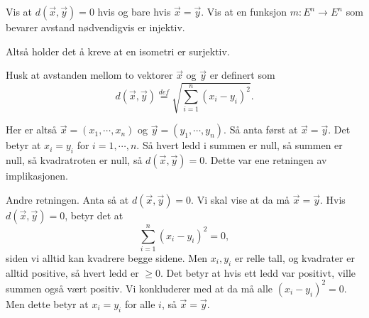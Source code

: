 \documentclass[11pt, norsk]{article}
\begin{document}
\begin{oppg}
Vis at $d(\vec x, \vec y) = 0$ hvis og bare hvis $\vec x = \vec y$. Vis at en funksjon $m:E^n \to E^n$ som bevarer avstand nødvendigvis er injektiv.

Altså holder det å kreve at en isometri er surjektiv.
\end{oppg}
\begin{losn}
Husk at avstanden mellom to vektorer $\vec x$ og $\vec y$ er definert som $$d(\vec x,\vec y) \stackrel{def}{=} \sqrt{ \sum_{i=1}^n (x_i-y_i)^2 }.$$

Her er altså $\vec x = (x_1,\cdots,x_n)$ og $\vec y = (y_1,\cdots,y_n)$. Så anta først at $\vec x = \vec y$. Det betyr at $x_i=y_i$ for $i=1,\cdots,n$. Så hvert ledd i summen er null, så summen er null, så kvadratroten er null, så $d(\vec x, \vec y)=0$. Dette var ene retningen av implikasjonen.

Andre retningen. Anta så at $d(\vec x, \vec y)=0$. Vi skal vise at da må $\vec x = \vec y$. Hvis $d(\vec x,\vec y)=0$, betyr det at 
\[
\sum_{i=1}^n (x_i-y_i)^2 = 0,
\]
siden vi alltid kan kvadrere begge sidene. Men $x_i,y_i$ er relle tall, og kvadrater er alltid positive, så hvert ledd er $\geq 0$. Det betyr at hvis ett ledd var positivt, ville summen også vært positiv. Vi konkluderer med at da må alle $(x_i-y_i)^2=0$. Men dette betyr at $x_i=y_i$ for alle $i$, så $\vec x = \vec y$.
\end{losn}
\end{document}
